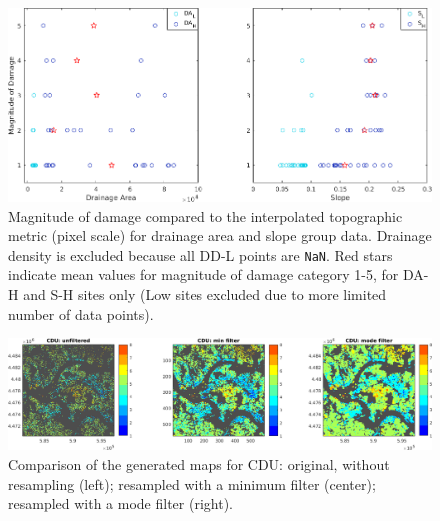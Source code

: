 \documentclass[final,12pt,times,twocolumn,authoryear]{elsarticle}
\begin{document}
\begin{figure}[hbt]
	\centering
	\includegraphics[width=\linewidth]{fig/Mag_DA_S_redstart}
	\caption{Magnitude of damage compared to the interpolated topographic metric (pixel scale) for drainage area and slope group data. Drainage density is excluded because all DD-L points are \texttt{NaN}. Red stars indicate mean values for magnitude of damage category 1-5, for DA-H and S-H sites only (Low sites excluded due to more limited number of data points).}
	\label{fig:maginterp}
\end{figure}

\begin{figure}[hbt]
	\centering
	\includegraphics[width=\linewidth]{fig/CDUfiltercompare}
	\caption{Comparison of the generated maps for CDU: original, without resampling (left); resampled with a minimum filter (center); resampled with a mode filter (right).}
	\label{fig:cducompare}
\end{figure}
\end{document}
